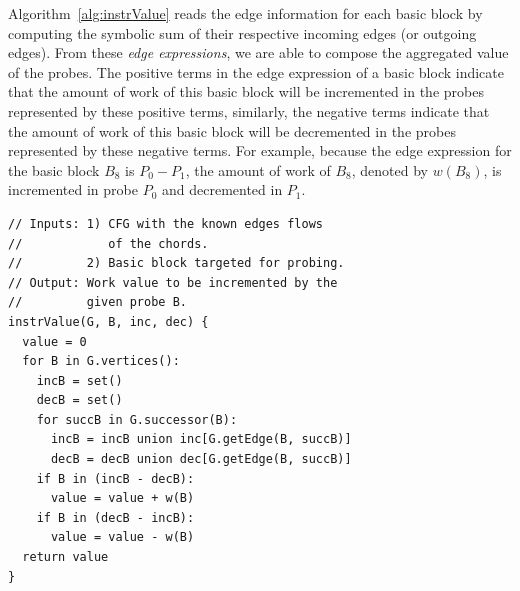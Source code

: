 \documentclass[sigplan,10pt]{acmart}
\theoremstyle{definition}
\begin{document}

Algorithm~\ref{alg:instrValue} reads the edge information for each basic block by computing the symbolic sum of their respective incoming edges (or outgoing edges).
From these \textit{edge expressions}, we are able to compose the aggregated value of the probes.
The positive terms in the edge expression of a basic block indicate that the amount of work of this basic block will be incremented in the probes represented by these positive terms, similarly, the negative terms indicate that the amount of work of this basic block will be decremented in the probes represented by these negative terms.
For example, because the edge expression for the basic block $B_8$ is $P_0 - P_1$, the amount of work of $B_8$, denoted by $w(B_8)$, is incremented in probe $P_0$ and decremented in $P_1$.

\begin{lstlisting}[caption={Pseudocode that describes how the edge information is used in order to extract the value that will be computed in a given instrumented basic block $B_I$. This algorithm could equally be implemented based on the predecessors.}, label={lst:instrValue}, float]
// Inputs: 1) CFG with the known edges flows
//            of the chords.
//         2) Basic block targeted for probing.
// Output: Work value to be incremented by the
//         given probe B.
instrValue(G, B, inc, dec) {
  value = 0
  for B in G.vertices():
    incB = set()
    decB = set()
    for succB in G.successor(B):
      incB = incB union inc[G.getEdge(B, succB)]
      decB = decB union dec[G.getEdge(B, succB)]
    if B in (incB - decB):
      value = value + w(B)
    if B in (decB - incB):
      value = value - w(B)
  return value
}
\end{lstlisting}
\end{document}
